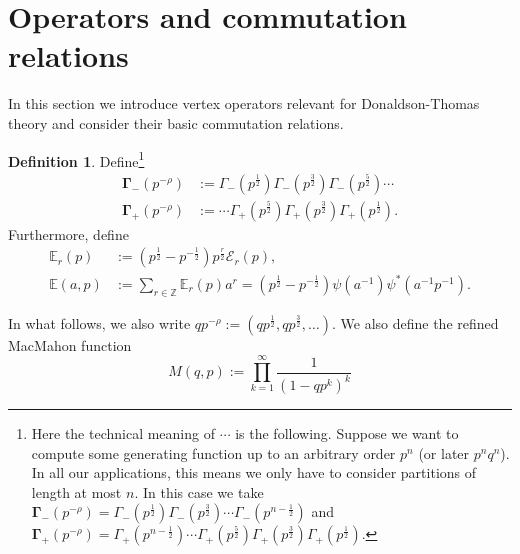 \documentclass{amsart}
\theoremstyle{definition}
\newtheorem{definition}[theorem]{Definition}
\newcommand{\ZZ} {\mathbb{Z}}		%
\newcommand{\E}{\mathcal{E}}
\newcommand{\EE}{\mathbb{E}}
\begin{document}
\section{Operators and commutation relations}

In this section we introduce vertex operators relevant for Donaldson-Thomas theory and consider their basic commutation relations.

\begin{definition} 
Define\footnote{Here the technical meaning of $\cdots$ is the following. Suppose we want to compute some generating function up to an arbitrary order $p^n$ (or later $p^n q^n$). In all our applications, this means we only have to consider partitions of length at most $n$. In this case we take $\mathbf{\Gamma}_{-}(p^{-\rho})   = \Gamma_{-}(p^{\frac{1}{2}}) \Gamma_{-}(p^{\frac{3}{2}}) \cdots \Gamma_{-}(p^{n-\frac{1}{2}})$ and $\mathbf{\Gamma}_{+}(p^{-\rho}) = \Gamma_{+}(p^{n-\frac{1}{2}}) \cdots \Gamma_{+}(p^{\frac{5}{2}}) \Gamma_{+}(p^{\frac{3}{2}}) \Gamma_{+}(p^{\frac{1}{2}})$.}
\begin{align*}
\mathbf{\Gamma}_{-}(p^{-\rho}) &:= \Gamma_{-}(p^{\frac{1}{2}}) \Gamma_{-}(p^{\frac{3}{2}}) \Gamma_{-}(p^{\frac{5}{2}}) \cdots \\
\mathbf{\Gamma}_{+}(p^{-\rho}) &:=  \cdots \Gamma_{+}(p^{\frac{5}{2}}) \Gamma_{+}(p^{\frac{3}{2}}) \Gamma_{+}(p^{\frac{1}{2}}).
\end{align*}
Furthermore, define
\begin{align*}
\EE_r(p) &:=(p^{\frac{1}{2}} - p^{-\frac{1}{2}}) p^{\frac{r}{2}} \E_r(p), \\
\EE(a,p) &:=\sum_{r \in \ZZ} \EE_r(p) a^{r} = (p^{\frac{1}{2}} - p^{-\frac{1}{2}}) \psi(a^{-1}) \psi^*(a^{-1} p^{-1}).
\end{align*}
\end{definition}

In what follows, we also write $q p^{-\rho} := (q p^{\frac{1}{2}}, q p^{\frac{3}{2}},  \ldots)$. We also define the refined MacMahon function
$$
M(q,p) := \prod_{k=1}^{\infty} \frac{1}{(1-q p^k)^k}
$$
\end{document}
